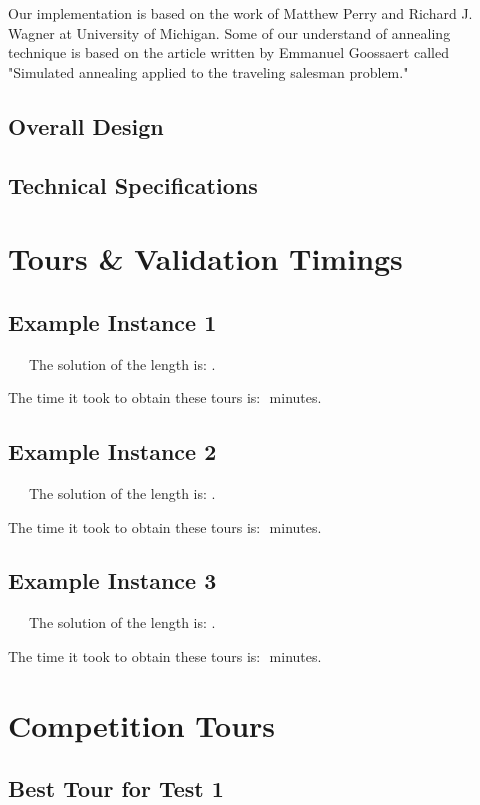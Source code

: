 \documentclass[11pt]{scrreprt}
\begin{document}
Our implementation is based on the work of Matthew Perry and Richard J. Wagner at University of Michigan. Some of our understand of annealing technique is based on the article written by Emmanuel Goossaert called "Simulated annealing applied to the traveling salesman problem."		 

\section{Overall Design}

\section{Technical Specifications}

\chapter{Tours \& Validation Timings}
\section{Example Instance 1}

\ \ \ The solution of the length is: $ $.

The time it took to obtain these tours is: $ $ minutes.


\section{Example Instance 2}

\ \ \ The solution of the length is: $ $.

The time it took to obtain these tours is: $ $ minutes.


\section{Example Instance 3}

\ \ \ The solution of the length is: $ $.

The time it took to obtain these tours is: $ $ minutes.

\chapter{Competition Tours}
\section{Best Tour for Test 1}
\end{document}
